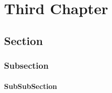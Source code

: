 \chapter{Third Chapter}



\section{Section}
\lipsum[1-2]

\subsection{Subsection}
\lipsum[1-2]

\subsubsection{SubSubSection}




\lipsum[1-2]


